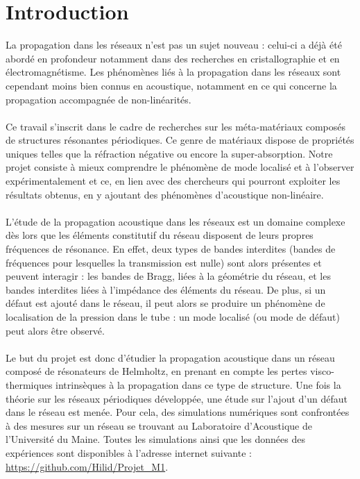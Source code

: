 \chapter*{Introduction}


La propagation dans les réseaux n'est pas un sujet nouveau : celui-ci a déjà été abordé en profondeur notamment dans des recherches en cristallographie et en électromagnétisme. Les phénomènes liés à la propagation dans les réseaux sont cependant moins bien connus en acoustique, notamment en ce qui concerne la propagation accompagnée de non-linéarités.\\~\\


Ce travail s'inscrit dans le cadre de recherches sur les méta-matériaux composés de structures résonantes périodiques. Ce genre de matériaux dispose de propriétés uniques telles que la réfraction négative ou encore la super-absorption. Notre projet consiste à mieux comprendre le phénomène de mode localisé et à l'observer expérimentalement et ce, en lien avec des chercheurs qui pourront exploiter les résultats obtenus, en y ajoutant des phénomènes d'acoustique non-linéaire.\\~\\


L'étude de la propagation acoustique dans les réseaux est un domaine complexe dès lors que les éléments constitutif du réseau disposent de leurs propres fréquences de résonance. En effet, deux types de bandes interdites (bandes de fréquences pour lesquelles la transmission est nulle) sont alors présentes et peuvent interagir : les bandes de Bragg, liées à la géométrie du réseau, et les bandes interdites liées à l'impédance des éléments du réseau. De plus, si un défaut est ajouté dans le réseau, il peut alors se produire un phénomène de localisation de la pression dans le tube : un mode localisé (ou mode de défaut) peut alors être observé. \\~\\


Le but du projet est donc d'étudier la propagation acoustique dans un réseau composé de résonateurs de Helmholtz, en prenant en compte les pertes visco-thermiques intrinsèques à la propagation dans ce type de structure. Une fois la théorie sur les réseaux périodiques développée, une étude sur l'ajout d'un défaut dans le réseau est menée. Pour cela, des simulations numériques sont confrontées à des mesures sur un réseau se trouvant au Laboratoire d'Acoustique de l'Université du Maine. Toutes les simulations ainsi que les données des expériences sont disponibles à l'adresse internet suivante : \url{https://github.com/Hilid/Projet_M1}.
